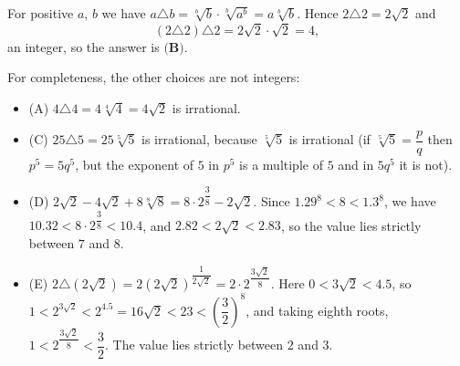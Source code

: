 For positive $a$, $b$ we have $a\triangle b=\sqrt[b]{b}\cdot\sqrt[b]{a^b}=a\sqrt[b]{b}$. Hence $2\triangle2=2\sqrt2$ and
\[(2\triangle2)\triangle2=2\sqrt2\cdot\sqrt2=4,\]
an integer, so the answer is $\boxed{\textbf{(B)}}$.

For completeness, the other choices are not integers:
\begin{itemize}
\item (A) $4\triangle4=4\sqrt[4]4=4\sqrt2$ is irrational.
\item (C) $25\triangle5=25\sqrt[5]5$ is irrational, because $\sqrt[5]5$ is irrational (if $\sqrt[5]5=\dfrac {p}{q}$ then $p^5=5q^5$, but the exponent of $5$ in $p^5$ is a multiple of $5$ and in $5q^5$ it is not).
\item (D) $2\sqrt2-4\sqrt2+8\sqrt[8]8=8\cdot2^{\dfrac{3}{8}}-2\sqrt2$. Since $1.29^8<8<1.3^8$, we have $10.32<8\cdot2^{\dfrac{3}{8}}<10.4$, and $2.82<2\sqrt2<2.83$, so the value lies strictly between $7$ and $8$.
\item (E) $2\triangle\left(2\sqrt2\right)=2\left(2\sqrt2\right)^{\dfrac{1}{2\sqrt2}}=2\cdot2^{\dfrac{3\sqrt2}{8}}$. Here $0<3\sqrt2<4.5$, so $1<2^{3\sqrt2}<2^{4.5}=16\sqrt2<23<\left(\dfrac{3}{2}\right)^8$, and taking eighth roots, $1<2^{\dfrac{3\sqrt2}{8}}<\dfrac{3}{2}$. The value lies strictly between $2$ and $3$.
\end{itemize}
